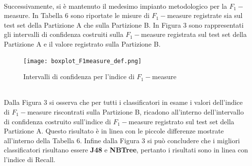 \documentclass[fleqn,10pt]{SelfArx}
\begin{document}
\\
Successivamente, si è mantenuto il medesimo impianto metodologico per la $F_1-$measure. In Tabella 6 sono riportate le misure di $F_1-$measure registrate sia sul test set della Partizione A che sulla Partizione B. In Figura 3 sono rappresentati gli intervalli di confidenza costruiti sulla $F_1-$measure registrata sul test set della Partizione A e il valore registrato sulla Partizione B.
\begin{table}[h!]
\caption{Confronto valori di $F_1-$measure}
\label{table:holdout}
\end{table}
\begin{figure}[h!]
  \texttt{[image: boxplot\_F1measure\_def.png]}\
  \caption{Intervalli di confidenza per l'indice di $F_1-$measure}
\end{figure}
\\
Dalla Figura 3 si osserva che per tutti i classificatori in esame i valori dell'indice di $F_1-$measure riscontrati sulla Partizione B, ricadono all'interno dell'intervallo di confidenza costruito sull'indice di $F_1-$measure registrato sul test set della Partizione A. Questo risultato è in linea con le piccole differenze mostrate all'interno della Tabella 6. Infine dalla Figura 3 si può concludere che i migliori classificatori risultano essere \textbf{J48} e \textbf{NBTree}, pertanto i risultati sono in linea con l'indice di Recall.\\
\end{document}
